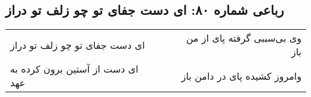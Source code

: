 \begin{center}
\section*{رباعی شماره ۸۰: ای دست جفای تو چو زلف تو دراز}
\label{sec:080}
\begin{longtable}{l p{0.5cm} r}
ای دست جفای تو چو زلف تو دراز
&&
وی بی‌سببی گرفته پای از من باز
\\
ای دست از آستین برون کرده به عهد
&&
وامروز کشیده پای در دامن باز
\\
\end{longtable}
\end{center}
